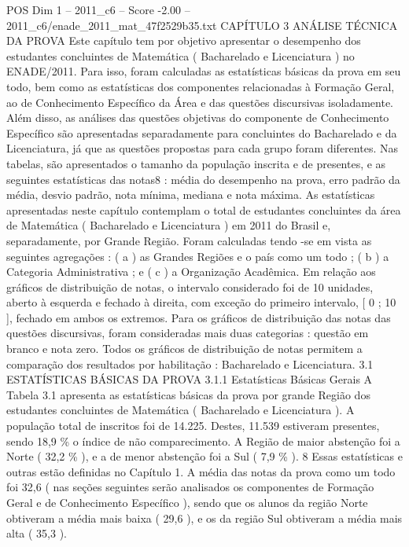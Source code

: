 \begin{textsample}{POS Dim 1 – 2011\_c6 – Score -2.00 – 2011\_c6/enade\_2011\_mat\_47f2529b35.txt}  \label{ex:f1_pos_220}
CAPÍTULO 3 ANÁLISE TÉCNICA DA PROVA Este capítulo tem por objetivo apresentar o desempenho dos estudantes concluintes de Matemática ( Bacharelado e Licenciatura ) no ENADE/2011.
Para isso, foram calculadas as estatísticas básicas da prova em seu todo, bem como as estatísticas dos componentes relacionadas à Formação Geral, ao de Conhecimento Específico da Área e das questões discursivas isoladamente.
Além disso, as análises das questões objetivas do componente de Conhecimento Específico são apresentadas separadamente para concluintes do Bacharelado e da Licenciatura, já que as questões propostas para cada grupo foram diferentes.
Nas tabelas, são apresentados o tamanho da população inscrita e de presentes, e as seguintes estatísticas das notas8 : média do desempenho na prova, erro padrão da média, desvio padrão, nota mínima, mediana e nota máxima.
As estatísticas apresentadas neste capítulo contemplam o total de estudantes concluintes da área de Matemática ( Bacharelado e Licenciatura ) em 2011 do Brasil e, separadamente, por Grande Região.
Foram calculadas tendo -se em vista as seguintes agregações : ( a ) as Grandes Regiões e o país como um todo ; ( b ) a Categoria Administrativa ; e ( c ) a Organização Acadêmica.
Em relação aos gráficos de distribuição de notas, o intervalo considerado foi de 10 unidades, aberto à esquerda e fechado à direita, com exceção do primeiro intervalo, [ 0 ; 10 ], fechado em ambos os extremos.
Para os gráficos de distribuição das notas das questões discursivas, foram consideradas mais duas categorias : questão em branco e nota zero.
Todos os gráficos de distribuição de notas permitem a comparação dos resultados por habilitação : Bacharelado e Licenciatura. 3.1 ESTATÍSTICAS BÁSICAS DA PROVA 3.1.1 Estatísticas Básicas Gerais A Tabela 3.1 apresenta as estatísticas básicas da prova por grande Região dos estudantes concluintes de Matemática ( Bacharelado e Licenciatura ).
A população total de inscritos foi de 14.225.
Destes, 11.539 estiveram presentes, sendo 18,9 \% o índice de não comparecimento.
A Região de maior abstenção foi a Norte ( 32,2 \% ), e a de menor abstenção foi a Sul ( 7,9 \% ). 8 Essas estatísticas e outras estão definidas no Capítulo 1.
A média das notas da prova como um todo foi 32,6 ( nas seções seguintes serão analisados os componentes de Formação Geral e de Conhecimento Específico ), sendo que os alunos da região Norte obtiveram a média mais baixa ( 29,6 ), e os da região Sul obtiveram a média mais alta ( 35,3 ).

\end{textsample}
